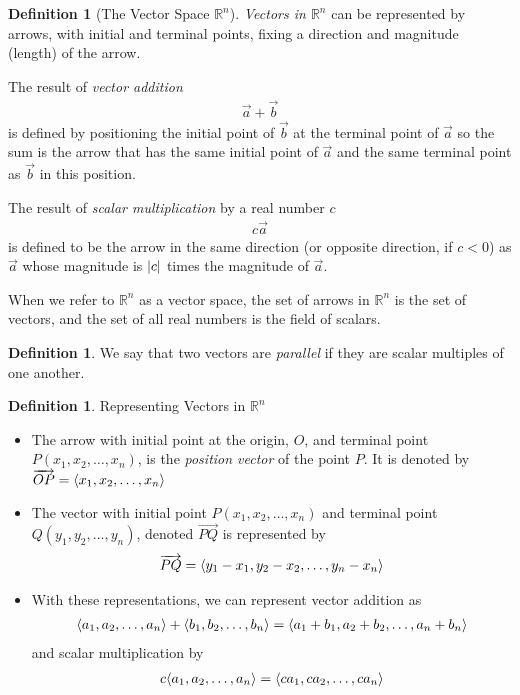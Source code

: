 \documentclass{article}[11pt]
\theoremstyle{definition}
\newtheorem{definition}[theorem]{Definition}
\DeclarePairedDelimiter\abs{\lvert}{\rvert}
\DeclarePairedDelimiter\vecvec{\langle}{\rangle}
\numberwithin{equation}{section}
\begin{document}
\begin{definition}[The Vector Space \(\mathbb{R}^n\)]
	\emph{Vectors in \(\mathbb{R}^n\)} can be represented by arrows, with initial and terminal points, fixing a direction and magnitude (length) of the arrow. 
	
	The result of \emph{vector addition}
	\begin{align*}
	\vec{a}+\vec{b}
	\end{align*}
	is defined by positioning the initial point of \(\vec{b}\) at the terminal point of \(\vec{a}\) so the sum is the arrow that has the same initial point of \(\vec{a}\) and the same terminal point as \(\vec{b}\) in this position.
	
	The result of \emph{scalar multiplication} by a real number \(c\)
	\begin{align*}
		c\vec{a}
	\end{align*}
	is defined to be the arrow in the same direction (or opposite direction, if \(c<0\)) as \(\vec{a}\) whose magnitude is \(\abs{c}\) times the magnitude of \(\vec{a}\).
	
	When we refer to \(\mathbb{R}^n\) as a vector space, the set of arrows in \(\mathbb{R}^n\) is the set of vectors, and the set of all real numbers is the field of scalars.
\end{definition}

\begin{definition}
	We say that two vectors are \emph{parallel} if they are scalar multiples of one another.
\end{definition}

\begin{definition}
	Representing Vectors in \(\mathbb{R}^n\)
	\begin{itemize}
		\item The arrow with initial point at the origin, \(O\), and terminal point \(P(x_1,x_2,\dots,x_n)\), is the \emph{position vector} of the point \(P\). It is denoted by \(\overrightarrow{OP} = \vecvec*{x_1,x_2,\dots,x_n} \)
		\item The vector with initial point \(P(x_1,x_2,\dots,x_n)\) and terminal point \(Q(y_1,y_2,\dots,y_n)\), denoted \(\overrightarrow{PQ}\) is represented by
			\begin{align}
				\overrightarrow{PQ}=\vecvec{y_1-x_1,y_2-x_2,\dots,y_n-x_n}
			\end{align}
		\item With these representations, we can represent vector addition as
			\begin{align}
				\vecvec{a_1,a_2,\dots,a_n}+\vecvec{b_1,b_2,\dots,b_n}  =  \vecvec{a_1+b_1,a_2+b_2,\dots,a_n+b_n}
			\end{align}
			and scalar multiplication by
			\begin{align}
				c\vecvec{a_1,a_2,\dots,a_n} =  \vecvec{ca_1,ca_2,\dots,ca_n}
			\end{align}
	\end{itemize}
\end{definition}
\end{document}
